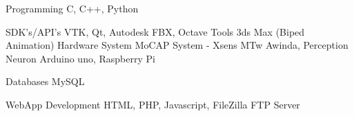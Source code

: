 

\begin{cvskills}

  \cvskill
    {Programming} %
    {C, C++, Python} %

  \cvskill
    {SDK's/API's} %
    {VTK, Qt, Autodesk FBX, Octave} %
  \cvskill
    {Tools} %
    {3ds Max (Biped Animation) } %
  \cvskill
    {Hardware System} %
    {MoCAP System - Xsens MTw Awinda, Perception Neuron} %
  \cvskill
    {} %
    {Arduino uno, Raspberry Pi } %

    \cvskill
    {Databases} %
     {MySQL} %

  \cvskill
    {WebApp Development} %
    {HTML, PHP, Javascript, FileZilla FTP Server} %
    
\end{cvskills}